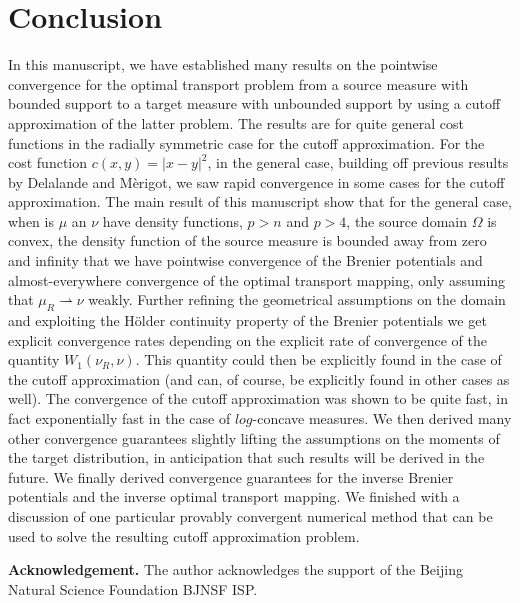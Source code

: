 \documentclass{amsart}
\theoremstyle{lemma}
\theoremstyle{remark}
\begin{document}
\section{Conclusion}\label{sec:conclusion}
In this manuscript, we have established many results on the pointwise convergence for the optimal transport problem from a source measure with bounded support to a target measure with unbounded support by using a cutoff approximation of the latter problem. The results are for quite general cost functions in the radially symmetric case for the cutoff approximation. For the cost function $c(x,y) = \vert x - y \vert^2$, in the general case, building off previous results by Delalande and M\`{e}rigot, we saw rapid convergence in some cases for the cutoff approximation. The main result of this manuscript show that for the general case, when is $\mu$ an $\nu$ have density functions, $p>n$ and $p>4$, the source domain $\Omega$ is convex, the density function of the source measure is bounded away from zero and infinity that we have pointwise convergence of the Brenier potentials and almost-everywhere convergence of the optimal transport mapping, only assuming that $\mu_{R} \rightharpoonup \nu$ weakly. Further refining the geometrical assumptions on the domain and exploiting the H\"{o}lder continuity property of the Brenier potentials we get explicit convergence rates depending on the explicit rate of convergence of the quantity $W_1(\nu_{R}, \nu)$. This quantity could then be explicitly found in the case of the cutoff approximation (and can, of course, be explicitly found in other cases as well). The convergence of the cutoff approximation was shown to be quite fast, in fact exponentially fast in the case of $log$-concave measures. We then derived many other convergence guarantees slightly lifting the assumptions on the moments of the target distribution, in anticipation that such results will be derived in the future. We finally derived convergence guarantees for the inverse Brenier potentials and the inverse optimal transport mapping. We finished with a discussion of one particular provably convergent numerical method that can be used to solve the resulting cutoff approximation problem.

\bigskip

\textbf{Acknowledgement.} The author acknowledges the support of the Beijing Natural Science Foundation BJNSF ISP.



\end{document}
